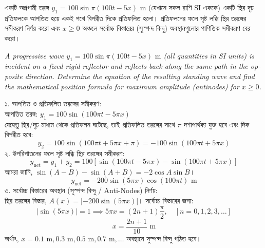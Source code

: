 \documentclass[12pt, a4paper]{article}
\begin{document}
\vspace{1.5em}

\begin{tcolorbox}[questionbox={প্রশ্ন (Question) 6}]
\noindent
একটি অগ্রগামী তরঙ্গ $y_1 = 100 \sin \pi(100t - 5x)\text{ m}$ (যেখানে সকল রাশি SI এককে) একটি স্থির দৃঢ় প্রতিফলকে আপতিত হয়ে একই পথে বিপরীত দিকে প্রতিফলিত হলো। প্রতিফলনের ফলে সৃষ্ট লব্ধি স্থির তরঙ্গের সমীকরণ নির্ণয় করো এবং $x \ge 0$ অঞ্চলে সর্বোচ্চ বিস্তারের (সুস্পন্দ বিন্দু) অবস্থানগুলোর গাণিতিক সমীকরণ বের করো।

\vspace{0.8em}
\begin{english}
\noindent\textit{\color{darkgray}
A progressive wave $y_1 = 100 \sin \pi(100t - 5x)\text{ m}$ (all quantities in SI units) is incident on a fixed rigid reflector and reflects back along the same path in the opposite direction. Determine the equation of the resulting standing wave and find the mathematical position formula for maximum amplitude (antinodes) for $x \ge 0$.
}
\end{english}
\end{tcolorbox}

\vspace{1em}

\begin{tcolorbox}[solutionbox={সমাধান (Solution)}]
\noindent
১. আপতিত ও প্রতিফলিত তরঙ্গের সমীকরণ: \\
আপতিত তরঙ্গ: $y_1 = 100 \sin(100\pi t - 5\pi x)$ \\
যেহেতু স্থির/দৃঢ় মাধ্যম থেকে প্রতিফলন ঘটেছে, তাই প্রতিফলিত তরঙ্গের সাথে $\pi$ দশাপার্থক্য যুক্ত হবে এবং দিক বিপরীত হবে:
\[ y_2 = 100 \sin(100\pi t + 5\pi x + \pi) = -100 \sin(100\pi t + 5\pi x) \]
২. উপরিপাতনের ফলে সৃষ্ট লব্ধি স্থির তরঙ্গের সমীকরণ:
\[ y_{\text{net}} = y_1 + y_2 = 100 [\sin(100\pi t - 5\pi x) - \sin(100\pi t + 5\pi x)] \]
আমরা জানি, $\sin(A-B) - \sin(A+B) = -2\cos A \sin B$।
\[ y_{\text{net}} = -200 \sin(5\pi x) \cos(100\pi t)\text{ m} \]
৩. সর্বোচ্চ বিস্তারের অবস্থান (সুস্পন্দ বিন্দু / Anti-Nodes) নির্ণয়: \\
স্থির তরঙ্গের বিস্তার, $A(x) = |-200 \sin(5\pi x)|$। সর্বোচ্চ বিস্তারের জন্য:
\[ |\sin(5\pi x)| = 1 \implies 5\pi x = (2n + 1)\frac{\pi}{2}, \quad [n = 0, 1, 2, 3, \dots] \]
\[ x = \frac{2n + 1}{10}\text{ m} \]
অর্থাৎ, $x = 0.1\text{ m}, 0.3\text{ m}, 0.5\text{ m}, 0.7\text{ m}, \dots$ অবস্থানে সুস্পন্দ বিন্দু গঠিত হবে।
\end{tcolorbox}
\end{document}
